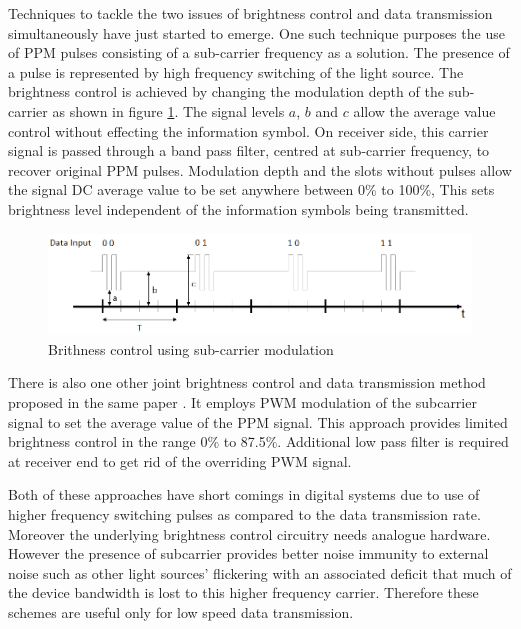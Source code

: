 Techniques to tackle the two issues of brightness control and data transmission simultaneously have just started to emerge. One such technique \cite{sugiyama2007brightness} purposes the use of PPM pulses consisting of a sub-carrier frequency as a solution. The presence of a pulse is represented by high frequency switching of the light source. The brightness control is achieved by changing the modulation depth of the sub-carrier as shown in figure \ref{fig:carrier_depth}. The signal levels $a$, $b$ and $c$ allow the average value control without effecting the information symbol. On receiver side, this carrier signal is passed through a band pass filter, centred at sub-carrier frequency, to recover original PPM pulses. Modulation depth and the slots without pulses allow the signal DC average value to be set anywhere between 0\% to 100\%, This sets brightness level independent of the information symbols being transmitted.

\begin{figure}
	\includegraphics[width=\textwidth]{./Figures/slide0042_image022.png}
	\caption{Brithness control using sub-carrier modulation}
	\label{fig:carrier_depth}
\end{figure}

There is also one other joint brightness control and data transmission method proposed in the same paper \cite{sugiyama2007brightness}. It employs PWM modulation of the subcarrier signal to set the average value of the PPM signal. This approach provides limited brightness control in the range 0\% to 87.5\%. Additional low pass filter is required at receiver end to get rid of the overriding PWM signal.

Both of these approaches have short comings in digital systems due to use of higher frequency switching pulses as compared to the data transmission rate. Moreover the underlying brightness control circuitry needs analogue hardware. However the presence of subcarrier provides better noise immunity to external noise such as other light sources' flickering with an associated deficit that much of the device bandwidth is lost to this higher frequency carrier. Therefore these schemes are useful only for low speed data transmission.

